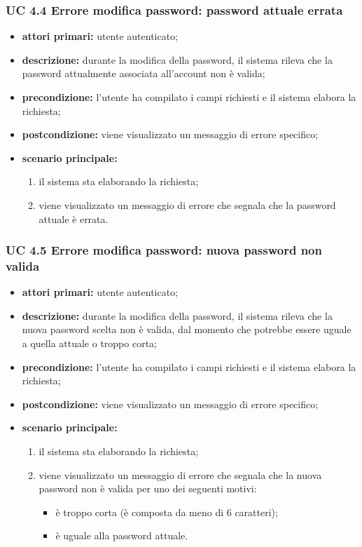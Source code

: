 			\subsubsection{UC 4.4 Errore modifica password: password attuale errata}
			\begin{itemize}
				\item \textbf{attori primari:} utente autenticato;
				\item \textbf{descrizione:} durante la modifica della password, il sistema rileva che la password attualmente associata all'account non è valida;
				\item \textbf{precondizione:} l'utente ha compilato i campi richiesti e il sistema elabora la richiesta;
				\item \textbf{postcondizione:} viene visualizzato un messaggio di errore specifico;
				\item \textbf{scenario principale:}
				\begin{enumerate}
					\item il sistema sta elaborando la richiesta;
					\item viene visualizzato un messaggio di errore che segnala che la password attuale è errata.
				\end{enumerate}
			\end{itemize}

			\subsubsection{UC 4.5 Errore modifica password: nuova password non valida}
			\begin{itemize}
				\item \textbf{attori primari:} utente autenticato;
				\item \textbf{descrizione:} durante la modifica della password, il sistema rileva che la nuova password scelta non è valida, dal momento che potrebbe essere uguale a quella attuale o troppo corta;
				\item \textbf{precondizione:} l'utente ha compilato i campi richiesti e il sistema elabora la richiesta;
				\item \textbf{postcondizione:} viene visualizzato un messaggio di errore specifico;
				\item \textbf{scenario principale:}
				\begin{enumerate}
					\item il sistema sta elaborando la richiesta;
					\item viene visualizzato un messaggio di errore che segnala che la nuova password non è valida per uno dei seguenti motivi:
					\begin{itemize}
						\item è troppo corta (è composta da meno di 6 caratteri);
						\item è uguale alla password attuale.
					\end{itemize}
				\end{enumerate}
			\end{itemize}

